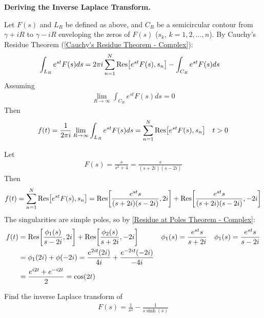 \documentclass[12pt, english]{book}
\makeatletter
\renewenvironment{proof}[1][\proofname]{\par
	\pushQED{\qed}%
	\normalfont \topsep6\p@\@plus6\p@\relax
	\list{}{%
		\settowidth{\leftmargin}{\itshape\proofname:\hskip\labelsep}%
		\setlength{\labelwidth}{0pt}%
		\setlength{\itemindent}{-\leftmargin}%
	}%
	\item[\hskip\labelsep\itshape#1\@addpunct{:}]\ignorespaces
}{%
	\popQED\endlist\@endpefalse
}
\makeatother
\begin{document}
	\textbf{Deriving the Inverse Laplace Transform.}

		Let \(F(s)\) and \(L_R\) be defined as above, and \(C_R\) be a semicircular contour from \(\gamma + iR\) to \(\gamma - iR\) enveloping the zeros of \(F(s)\) (\(s_k\), \(k = 1, 2, \ldots, n\)). By Cauchy's Residue Theorem (\cref{Cauchy's Residue Theorem - Complex}):
		\begin{align*}
			\int_{L_R} e^{st} F(s) ds &= 2\pi i \sum_{n=1}^{N} \Res[e^{st} F(s), s_n] - \int_{C_R} e^{st} F(s) ds
		\end{align*}
		Assuming
		\begin{align*}
			\lim_{R \rightarrow \infty} \int_{C_R} e^{st} F(s) ds = 0
		\end{align*}
		Then
		\begin{align*}
			f(t) 
			&= \frac{1}{2\pi i} \lim_{R \rightarrow \infty} \int_{L_R} e^{st} F(s) ds  
			= \sum_{n=1}^{N} \Res[e^{st} F(s), s_n]
				& t>0
		\end{align*}
	
	\begin{example}
		Let 
		\begin{align*}
			F(s) = \frac{s}{s^2 + 4} = \frac{s}{(s+2i)(s-2i)}
		\end{align*}
		Then
		\begin{align*}
			f(t) 
			= \sum_{n=1}^{N} \Res[e^{st} F(s), s_n]
			= \Res[\frac{e^{st} s}{(s+2i)(s-2i)}, 2i] + \Res[\frac{e^{st} s}{(s+2i)(s-2i)}, -2i]
		\end{align*}
		The singularities are simple poles, so by \cref{Residue at Poles Theorem - Complex}:
		\begin{align*}
			f(t) 
			&= \Res[\frac{\phi_1 (s)}{s-2i}, 2i] + \Res[\frac{\phi_2 (s)}{s+2i}, -2i] &
				\phi_1 (s) &= \frac{e^{st} s}{s + 2i} &
				\phi_1 (s) &= \frac{e^{st} s}{s - 2i} \\
			&= \phi_1(2i) + \phi(-2i) = \frac{e^{2it} (2i)}{4i} + \frac{e^{-2it} (-2i)}{-4i} \\
			&= \frac{e^{i2t} + e^{-i2t}}{2} = \cos(2t)
		\end{align*}
	\end{example}

	\begin{example}
		Find the inverse Laplace transform of
		\begin{align*}
			F(s) = \frac{1}{s^2} - \frac{1}{s \sinh(s)}
		\end{align*}
		\begin{proof}
			{\color{Grey}
			
			}
		\end{proof}
	\end{example}
	
\end{document}
